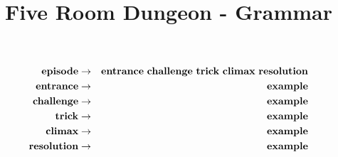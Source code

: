 \documentclass{article}
\title{Five Room Dungeon - Grammar}
\date{}
\begin{document}
\newcommand\ra{\ensuremath{\rightarrow}}

\maketitle

\begin{eqnarray*}
{\bf episode} & \ra & {\bf entrance}\ {\bf challenge}\ {\bf trick}\ {\bf climax}\ {\bf resolution}\\
{\bf entrance} & \ra & {\bf example}\\
{\bf challenge} & \ra & {\bf example}\\
{\bf trick} & \ra & {\bf example}\\
{\bf climax} & \ra & {\bf example}\\
{\bf resolution} & \ra & {\bf example}\\
\end{eqnarray*}
\end{document}
